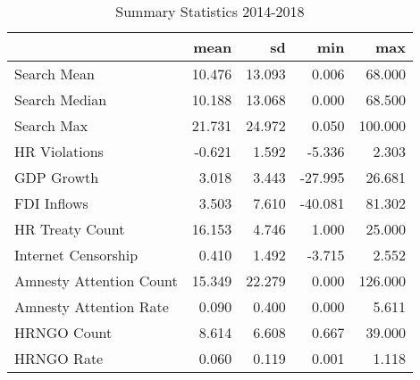 \begin{table}[ht]
\centering
\begin{tabular}{|l|rrrr|}
  \hline
 & mean & sd & min & max \\ 
  \hline
Search Mean & 10.476 & 13.093 & 0.006 & 68.000 \\ 
  Search Median & 10.188 & 13.068 & 0.000 & 68.500 \\ 
  Search Max & 21.731 & 24.972 & 0.050 & 100.000 \\ 
  HR Violations & -0.621 & 1.592 & -5.336 & 2.303 \\ 
  GDP Growth & 3.018 & 3.443 & -27.995 & 26.681 \\ 
  FDI Inflows & 3.503 & 7.610 & -40.081 & 81.302 \\ 
  HR Treaty Count & 16.153 & 4.746 & 1.000 & 25.000 \\ 
  Internet Censorship & 0.410 & 1.492 & -3.715 & 2.552 \\ 
  Amnesty Attention Count & 15.349 & 22.279 & 0.000 & 126.000 \\ 
  Amnesty Attention Rate & 0.090 & 0.400 & 0.000 & 5.611 \\ 
  HRNGO Count & 8.614 & 6.608 & 0.667 & 39.000 \\ 
  HRNGO Rate & 0.060 & 0.119 & 0.001 & 1.118 \\ 
   \hline
\end{tabular}
\caption{Summary Statistics 2014-2018} 
\end{table}
